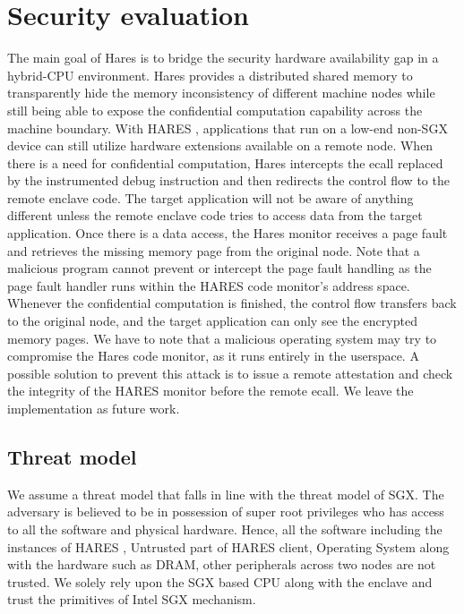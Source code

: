 \documentclass[article, doublespace,nopageskip]{VTthesis} %
\newcommand{\monitor}{HARES }
\begin{document}
    \section{Security evaluation} \label{sse:Security evaluation}
    The main goal of Hares is to bridge the security hardware availability gap in a hybrid-CPU environment. Hares provides a distributed shared memory to transparently hide the memory inconsistency of different machine nodes while still being able to expose the confidential computation capability across the machine boundary. With \monitor, applications that run on a low-end non-SGX device can still utilize hardware extensions available on a remote node.
    When there is a need for confidential computation, Hares intercepts the ecall replaced by the instrumented debug instruction and then redirects the control flow to the remote enclave code. The target application will not be aware of anything different unless the remote enclave code tries to access data from the target application. Once there is a data access, the Hares monitor receives a
    page fault and retrieves the missing memory page from the original node. Note that a malicious program cannot prevent or intercept the page fault handling as the page fault handler runs within the \monitor code monitor’s address space. Whenever the confidential computation is finished, the control flow transfers back to the original node, and the target application can only see the encrypted
    memory pages. We have to note that a malicious operating system may try to compromise the Hares code monitor, as it runs entirely in the userspace. A possible solution to prevent this attack is to issue a remote attestation and check the integrity of the \monitor monitor before the remote ecall. We leave the implementation as future work.
    
    \subsection{Threat model}
    We assume a threat model that falls in line with the threat model of SGX. The adversary is believed to be in possession of super root privileges who has access to all the software and physical hardware. Hence, all the software including the instances of \monitor, Untrusted part of \monitor client, Operating System along with the hardware such as DRAM, other peripherals across two nodes are not trusted. We solely rely upon the SGX based CPU along with the enclave and trust the primitives of Intel SGX mechanism.
\end{document}
